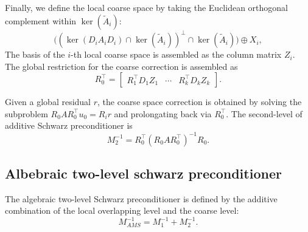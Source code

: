 \documentclass{article}
\theoremstyle{definition}
\theoremstyle{remark}
\begin{document}
Finally, we define the local coarse space by taking the Euclidean orthogonal complement within $\ker(\tilde A_i)$:
\[
\big((\ker(D_i A_{i} D_i) \cap \ker(\tilde{A}_{i}))^{\perp} \cap \ker(\tilde{A}_{i})\big)\oplus X_i,
\]
The basis of the $i$-th local coarse space is assembled as the column matrix $Z_i$.
The global restriction for the coarse correction is assembled as
\[
R_0^{\top} = \begin{bmatrix}
R_1^{\top} D_1 Z_1 & \cdots & R_k^{\top} D_k Z_k
\end{bmatrix}.
\]

Given a global residual $r$, the coarse space correction is obtained by solving the subproblem $R_0 A R_0^{\top} u_0 = R_i r$ and prolongating back via $R_0^{\top}$. 
The second-level of additive Schwarz preconditioner is 
\begin{equation}\label{ams2}
  M_2^{-1} = R_{0}^\top (R_{0}AR_{0}^\top)^{-1} R_{0}.
\end{equation}

\subsection{Albebraic two-level schwarz preconditioner}
The algebraic two-level Schwarz preconditioner is defined by the additive combination of the local overlapping level and the coarse level:
\begin{equation}\label{ams}
    M_{AMS}^{-1} = M_1^{-1} + M_2^{-1}.
\end{equation}
\end{document}
